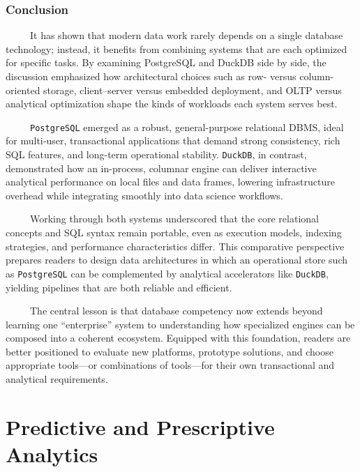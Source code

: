 \documentclass[
  letterpaper,
  DIV=11,
  numbers=noendperiod]{scrreprt}
\begin{document}
\section{Conclusion}\label{conclusion}

~~~~~It has shown that modern data work rarely depends on a single
database technology; instead, it benefits from combining systems that
are each optimized for specific tasks. By examining PostgreSQL and
DuckDB side by side, the discussion emphasized how architectural choices
such as row- versus column-oriented storage, client--server versus
embedded deployment, and OLTP versus analytical optimization shape the
kinds of workloads each system serves best. \hspace{0pt}

~~~~~\texttt{PostgreSQL} emerged as a robust, general-purpose relational
DBMS, ideal for multi-user, transactional applications that demand
strong consistency, rich SQL features, and long-term operational
stability. \texttt{DuckDB}, in contrast, demonstrated how an in-process,
columnar engine can deliver interactive analytical performance on local
files and data frames, lowering infrastructure overhead while
integrating smoothly into data science workflows. \hspace{0pt}

~~~~~Working through both systems underscored that the core relational
concepts and SQL syntax remain portable, even as execution models,
indexing strategies, and performance characteristics differ. This
comparative perspective prepares readers to design data architectures in
which an operational store such as \texttt{PostgreSQL} can be
complemented by analytical accelerators like \texttt{DuckDB}, yielding
pipelines that are both reliable and efficient. \hspace{0pt}

~~~~~The central lesson is that database competency now extends beyond
learning one ``enterprise'' system to understanding how specialized
engines can be composed into a coherent ecosystem. Equipped with this
foundation, readers are better positioned to evaluate new platforms,
prototype solutions, and choose appropriate tools---or combinations of
tools---for their own transactional and analytical requirements.

\part{Predictive and Prescriptive Analytics}
\end{document}
